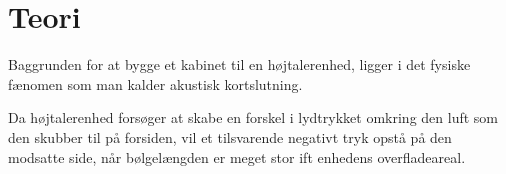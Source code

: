 \chapter{Teori}

Baggrunden for at bygge et kabinet til en højtalerenhed, ligger i det fysiske fænomen som man kalder akustisk kortslutning. 

Da højtalerenhed forsøger at skabe en forskel i lydtrykket omkring den luft som den skubber til på forsiden, vil et tilsvarende negativt tryk opstå på den modsatte side, når bølgelængden er meget stor ift enhedens overfladeareal.  



